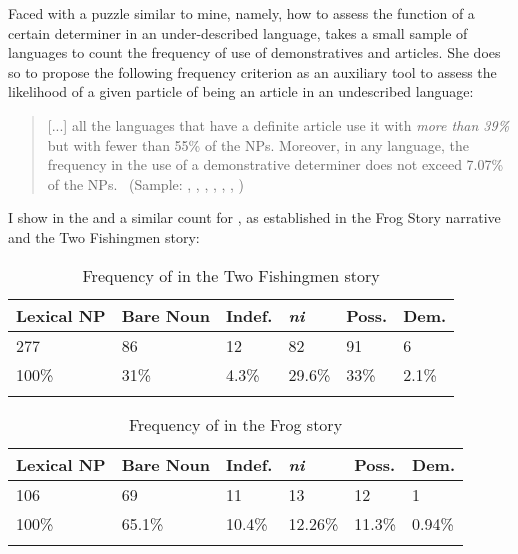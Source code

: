 \documentclass[output=paper
,modfonts
,nonflat]{langsci/langscibook}
\begin{document}
Faced with a puzzle similar to mine, namely, how to assess the function of a certain determiner in an under-described language, \citet{Cyr1993} takes a small sample of languages to count the frequency of use of demonstratives and articles. She does so to propose the following frequency criterion as an auxiliary tool to assess the likelihood of a given particle of being an article in an undescribed language:


\begin{quotation}
	[...] all the languages that have a definite article use it with \textit{more than 39\%} but with fewer than 55\% of the NPs. Moreover, in any language, the frequency in the use of a demonstrative determiner does not exceed 7.07\% of the NPs.~\citep[222]{Cyr1993} (Sample: , , , , , , )
\end{quotation}


I show in the  and  a similar count for , as established in the Frog Story narrative and the Two Fishingmen story:

\begin{table}[h]
	\centering
	\caption{Frequency of  in the Two Fishingmen story}
	\label{tab:pico:3}
	\begin{tabular}{llllll}
		\lsptoprule
		Lexical NP & Bare Noun & Indef. & \cellcolor{lsLightGray}\textit{ni} & Poss.  & Dem.  \\ \midrule
		277        & 86        & 12     & 82                                  & 91     & 6     \\ 
		100\%      & 31\%      & 4.3\%  & \cellcolor{lsLightGray}29.6\%      & 33\% & 2.1\% \\ \lspbottomrule
	\end{tabular}
\end{table}

\begin{table}[h]
	\centering
	\caption{Frequency of  in the Frog story}
	\label{tab:pico:4}
	\begin{tabular}{llllll}
		\lsptoprule
		Lexical NP & Bare Noun & Indef. & \cellcolor{lsLightGray}\textit{ni} & Poss.  & Dem.  \\ \midrule
		106        & 69        & 11     & 13                                  & 12     & 1     \\ 
		100\%      & 65.1\%      & 10.4\%  & \cellcolor{lsLightGray}12.26\%      & 11.3\% & 0.94\% \\ \lspbottomrule
	\end{tabular}
\end{table}
\end{document}
